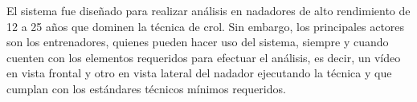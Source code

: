 El sistema fue diseñado para realizar análisis en nadadores de alto rendimiento de 12 
a 25 años que dominen la técnica de crol. Sin embargo, los principales actores son los 
entrenadores, quienes pueden hacer uso del sistema, siempre y cuando cuenten con los 
elementos requeridos para efectuar el análisis, es decir, un vídeo en vista frontal 
y otro en vista lateral del nadador ejecutando la técnica y que cumplan con los 
estándares técnicos mínimos requeridos.